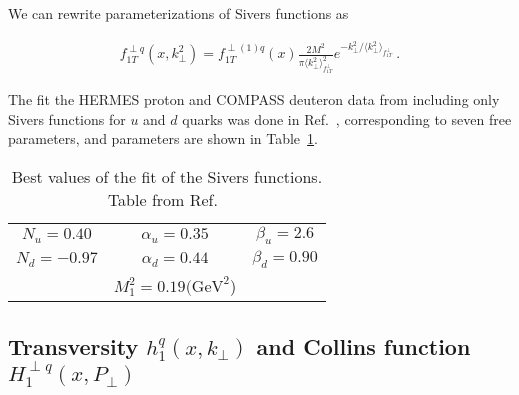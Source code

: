 \documentclass[a4paper,11pt]{article}
\newcommand{\ba}{\begin{eqnarray}}
\newcommand{\ea}{\end{eqnarray}}
\newcommand{\la}{\langle}
\newcommand{\ra}{\rangle}
\def\kperp{k_\perp}
\def\avkperp{\la \kperp^2 \ra}
\begin{document}
We can rewrite parameterizations of Sivers functions as

\ba
f_{1T}^{\perp q}(x,\kperp^2) =  f_{1T}^{\perp (1) q}(x)   \frac{2 M^2}{\pi \avkperp_{f_{1T}^\perp}^2} e^{-\kperp^2/{\avkperp_{f_{1T}^\perp}}}
\label{sivers_new} \ .
\ea

The fit the HERMES proton and COMPASS deuteron data from 
including only Sivers functions for $u$ and $d$ quarks was done in Ref.~\cite{Anselmino:2011gs},
corresponding to seven free parameters, and parameters are shown in Table~\ref{tab:a}.


\begin{table}
\centering
\begin{tabular}{ccc}
\hline
$N_u=0.40$ & $\alpha_u=0.35$ & $\beta_u=2.6$ \\
$N_d=-0.97$ & $\alpha_d=0.44$ & $\beta_d=0.90$\\
& $M_1^2=0.19\textrm{(GeV}^2$) &   \\
\hline
\end{tabular}
\caption{Best values of the fit of the Sivers functions. Table from Ref.~\cite{Anselmino:2011gs}}
\label{tab:a}
\end{table}



\subsection{\boldmath Transversity $h_{1}^{q}(x,k_\perp)$ and 
Collins function $H_{1}^{\perp q}(x,P_\perp)$}
\label{App:basis-h1-H1perp}
\end{document}
